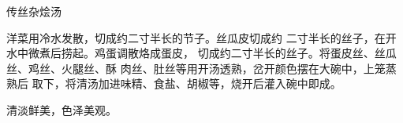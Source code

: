 \begin{recipe}{传丝杂烩汤}

\ingredients




\cooking

洋菜用冷水发散，切成约二寸半长的节子。丝瓜皮切成约 二寸半长的丝子，在开水中微煮后捞起。鸡蛋调散烙成蛋皮， 切成约二寸半长的丝子。将蛋皮丝、丝瓜丝、鸡丝、火腿丝、酥 肉丝、肚丝等用开汤透熟，岔开颜色摆在大碗中，上笼蒸熟后 取下，将清汤加进味精、食盐、胡椒等，烧开后灌入碗中即成。

\notes

清淡鲜美，色泽美观。

\end{recipe}


